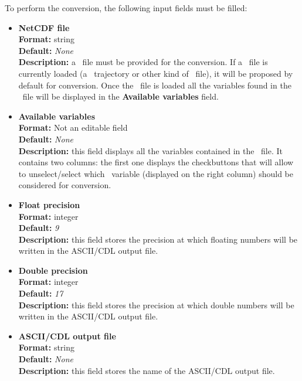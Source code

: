 \documentclass[a4paper,11pt]{report}
\begin{document}
To perform the conversion, the following input fields must be filled:
\hypertarget{convert_netcdf_to_ascii_netcdf_input_file}{}
\begin{itemize}
\item \textbf{NetCDF file}\\
\textbf{Format:} string\\
\textbf{Default:} \textit{None}\\
\textbf{Description:} a \NetCDF\ file must be provided for the conversion. If a \NetCDF\ file is currently loaded (a \MMTK\ 
trajectory or other kind of \NetCDF\ file), it will be proposed by default for conversion. Once the \NetCDF\ file is loaded 
all the variables found in the \NetCDF\ file will be displayed in the \textbf{Available variables} field.

\hypertarget{convert_netcdf_to_ascii_available_variables}{}
\item \textbf{Available variables}\\
\textbf{Format:} Not an editable field\\
\textbf{Default:} \textit{None}\\
\textbf{Description:} this field displays all the variables contained in the \NetCDF\ file. It contains two columns: 
the first one displays the checkbuttons that will allow to unselect/select which \NetCDF\ variable (displayed on the right column) 
should be considered for conversion.

\hypertarget{convert_netcdf_to_ascii_float_precision}{}
\item \textbf{Float precision}\\
\textbf{Format:} integer\\
\textbf{Default:} \textit{9}\\
\textbf{Description:} this field stores the precision at which floating numbers will be written in the ASCII/CDL output file.

\hypertarget{convert_netcdf_to_ascii_double_precision}{}
\item \textbf{Double precision}\\
\textbf{Format:} integer\\
\textbf{Default:} \textit{17}\\
\textbf{Description:} this field stores the precision at which double numbers will be written in the ASCII/CDL output file.

\hypertarget{convert_netcdf_to_ascii_ascii_output_file}{}
\item \textbf{ASCII/CDL output file}\\
\textbf{Format:} string\\
\textbf{Default:} \textit{None}\\
\textbf{Description:} this field stores the name of the ASCII/CDL output file.\\
\end{itemize}
\end{document}
